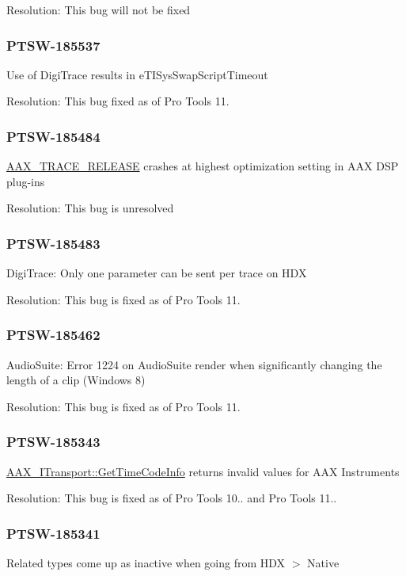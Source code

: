 Resolution\+: This bug will not be fixed\hypertarget{a00374_PTSW-185537}{}\subsubsection{P\+T\+S\+W-\/185537}\label{a00374_PTSW-185537}
Use of Digi\+Trace results in {\ttfamily e\+T\+I\+Sys\+Swap\+Script\+Timeout} 

Resolution\+: This bug fixed as of Pro Tools 11.\hypertarget{a00374_PTSW-185484}{}\subsubsection{P\+T\+S\+W-\/185484}\label{a00374_PTSW-185484}
\hyperlink{a00158_ac2aa820ece56bb59140ad561218db4b3}{A\+A\+X\+\_\+\+T\+R\+A\+C\+E\+\_\+\+R\+E\+L\+E\+A\+S\+E} crashes at highest optimization setting in A\+A\+X D\+S\+P plug-\/ins

Resolution\+: This bug is unresolved\hypertarget{a00374_PTSW-185483}{}\subsubsection{P\+T\+S\+W-\/185483}\label{a00374_PTSW-185483}
Digi\+Trace\+: Only one parameter can be sent per trace on H\+D\+X

Resolution\+: This bug is fixed as of Pro Tools 11.\hypertarget{a00374_PTSW-185462}{}\subsubsection{P\+T\+S\+W-\/185462}\label{a00374_PTSW-185462}
Audio\+Suite\+: Error 1224 on Audio\+Suite render when significantly changing the length of a clip (Windows 8)

Resolution\+: This bug is fixed as of Pro Tools 11.\hypertarget{a00374_PTSW-185343}{}\subsubsection{P\+T\+S\+W-\/185343}\label{a00374_PTSW-185343}
\hyperlink{a00116_a3babe261ec37aa4a61c4cbd74f123bc0}{A\+A\+X\+\_\+\+I\+Transport\+::\+Get\+Time\+Code\+Info} returns invalid values for A\+A\+X Instruments

Resolution\+: This bug is fixed as of Pro Tools 10.. and Pro Tools 11..\hypertarget{a00374_PTSW-185341}{}\subsubsection{P\+T\+S\+W-\/185341}\label{a00374_PTSW-185341}
Related types come up as inactive when going from H\+D\+X $>$ Native

